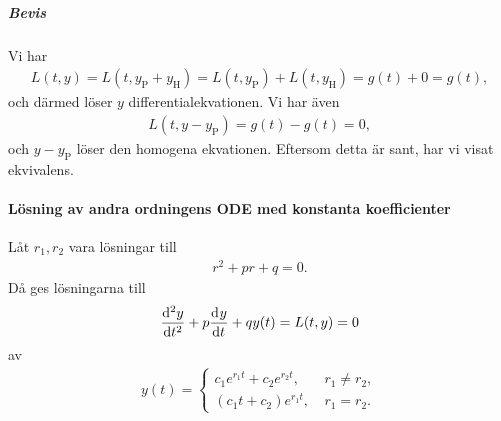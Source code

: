 \subparagraph{Bevis}
Vi har
\begin{align*}
	L(t, y) = L(t, y_{\text{P}} + y_{\text{H}}) = L(t, y_{\text{P}}) + L(t, y_{\text{H}}) = g(t) + 0 = g(t),
\end{align*}
och därmed löser $y$ differentialekvationen. Vi har även
\begin{align*}
	L(t, y - y_{\text{P}}) = g(t) - g(t) = 0,
\end{align*}
och $y - y_{\text{P}}$ löser den homogena ekvationen. Eftersom detta är sant, har vi visat ekvivalens.

\paragraph{Lösning av andra ordningens ODE med konstanta koefficienter}
Låt $r_1, r_2$ vara lösningar till
\begin{align*}
	r^2 + pr + q = 0.
\end{align*}
Då ges lösningarna till
\begin{align*}
	\dv[2]{y}{t} (t) + p\dv[]{y}{t} (t) + qy(t) = L(t, y) = 0
\end{align*}
av
\begin{align*}
	y(t) = 
	\begin{cases}
		c_1e^{r_1t} + c_2e^{r_2t},\ &r_1\neq r_2, \\
		(c_1t + c_2)e^{r_1t},\      &r_1 = r_2.
	\end{cases}
\end{align*}